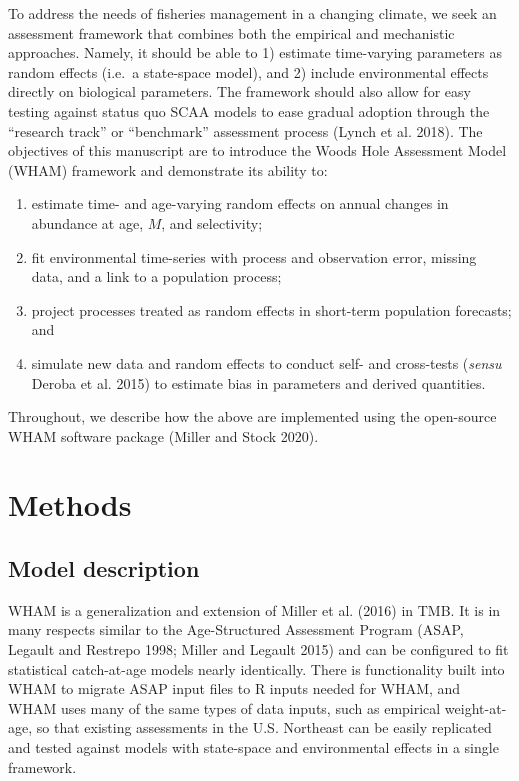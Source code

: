 \documentclass[]{article}
\providecommand{\tightlist}{%
  \setlength{\itemsep}{0pt}\setlength{\parskip}{0pt}}
\begin{document}
To address the needs of fisheries management in a changing climate, we
seek an assessment framework that combines both the empirical and
mechanistic approaches. Namely, it should be able to 1) estimate
time-varying parameters as random effects (i.e.~a state-space model),
and 2) include environmental effects directly on biological parameters.
The framework should also allow for easy testing against status quo SCAA
models to ease gradual adoption through the ``research track'' or
``benchmark'' assessment process (Lynch et al. 2018). The objectives of
this manuscript are to introduce the Woods Hole Assessment Model (WHAM)
framework and demonstrate its ability to:

\begin{enumerate}
\def\labelenumi{\arabic{enumi}.}
\tightlist
\item
  estimate time- and age-varying random effects on annual changes in
  abundance at age, \(M\), and selectivity;
\item
  fit environmental time-series with process and observation error,
  missing data, and a link to a population process;
\item
  project processes treated as random effects in short-term population
  forecasts; and
\item
  simulate new data and random effects to conduct self- and cross-tests
  (\emph{sensu} Deroba et al. 2015) to estimate bias in parameters and
  derived quantities.
\end{enumerate}

Throughout, we describe how the above are implemented using the
open-source WHAM software package (Miller and Stock 2020).

\hypertarget{methods}{%
\section{Methods}\label{methods}}

\hypertarget{model-description}{%
\subsection{Model description}\label{model-description}}

WHAM is a generalization and extension of Miller et al. (2016) in TMB.
It is in many respects similar to the Age-Structured Assessment Program
(ASAP, Legault and Restrepo 1998; Miller and Legault 2015) and can be
configured to fit statistical catch-at-age models nearly identically.
There is functionality built into WHAM to migrate ASAP input files to R
inputs needed for WHAM, and WHAM uses many of the same types of data
inputs, such as empirical weight-at-age, so that existing assessments in
the U.S. Northeast can be easily replicated and tested against models
with state-space and environmental effects in a single framework.
\end{document}
